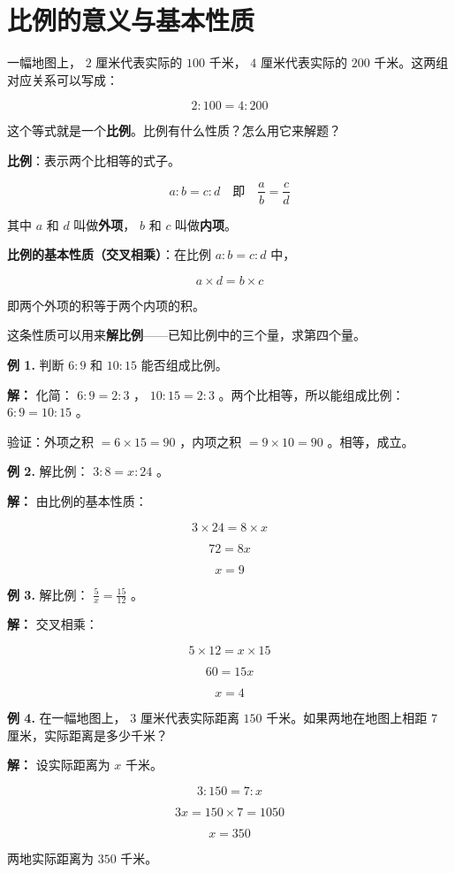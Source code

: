 \section*{比例的意义与基本性质}


\begin{explore}


一幅地图上， $2$ 厘米代表实际的 $100$ 千米， $4$ 厘米代表实际的 $200$ 千米。这两组对应关系可以写成：

\[
2 : 100 = 4 : 200
\]


这个等式就是一个\textbf{比例}。比例有什么性质？怎么用它来解题？

\end{explore}

\begin{understand}


\textbf{比例}：表示两个比相等的式子。

\[
a : b = c : d \quad \text{即} \quad \frac{a}{b} = \frac{c}{d}
\]


其中 $a$ 和 $d$ 叫做\textbf{外项}， $b$ 和 $c$ 叫做\textbf{内项}。

\textbf{比例的基本性质（交叉相乘）}：在比例 $a : b = c : d$ 中，

\[
a \times d = b \times c
\]


即两个外项的积等于两个内项的积。

这条性质可以用来\textbf{解比例}——已知比例中的三个量，求第四个量。

\end{understand}

\begin{workedexamples}


\textbf{例 1.} 判断 $6 : 9$ 和 $10 : 15$ 能否组成比例。

\textbf{解：} 化简： $6 : 9 = 2 : 3$ ， $10 : 15 = 2 : 3$ 。两个比相等，所以能组成比例： $6 : 9 = 10 : 15$ 。

验证：外项之积 $= 6 \times 15 = 90$ ，内项之积 $= 9 \times 10 = 90$ 。相等，成立。

\textbf{例 2.} 解比例： $3 : 8 = x : 24$ 。

\textbf{解：} 由比例的基本性质：

\[
3 \times 24 = 8 \times x
\]


\[
72 = 8x
\]


\[
x = 9
\]


\textbf{例 3.} 解比例： $\frac{5}{x} = \frac{15}{12}$ 。

\textbf{解：} 交叉相乘：

\[
5 \times 12 = x \times 15
\]


\[
60 = 15x
\]


\[
x = 4
\]


\textbf{例 4.} 在一幅地图上， $3$ 厘米代表实际距离 $150$ 千米。如果两地在地图上相距 $7$ 厘米，实际距离是多少千米？

\textbf{解：} 设实际距离为 $x$ 千米。

\[
3 : 150 = 7 : x
\]


\[
3x = 150 \times 7 = 1050
\]


\[
x = 350
\]


两地实际距离为 $350$ 千米。

\end{workedexamples}

